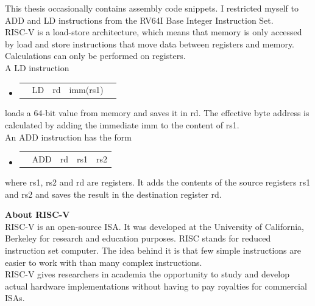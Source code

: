 \documentclass[12pt,a4paper]{article} %
\newenvironment {assembly}{\begingroup \ttfamily \color{Gray} \begin{itemize} \item[]}{\end{itemize}\endgroup}
\begin{document}
This thesis occasionally contains assembly code snippets. I restricted myself to ADD and LD instructions from the RV64I Base Integer Instruction Set.\\
RISC-V is a load-store architecture, which means that memory is only accessed by load and store instructions that move data between registers and memory. Calculations can only be performed on registers. \\ 
A LD instruction  
\begin{assembly}
	\begin{tabularx} {\textwidth} {n o a a X}
		& LD 	& rd & imm(rs1) \\
	\end{tabularx}
\end{assembly}
loads a 64-bit value from memory and saves it in rd. The effective byte address is calculated by adding the immediate imm to the content of rs1.\\
An ADD instruction has the form
\begin{assembly}
	\begin{tabularx} {\textwidth} {n o a a X}
		& ADD 	& rd & rs1		& rs2 \\
	\end{tabularx}
\end{assembly}
where rs1, rs2 and rd are registers. It adds the contents of the source registers rs1 and rs2 and saves the result in the destination register rd.\\

\cite[p.~5, p.~18f, p.~31]{riscv}


\vspace{2cm}


{}
\label{sec-riscv}
\textbf{\Large About RISC-V}\\

RISC-V is an open-source ISA. It was developed at the University of California, Berkeley for research and education purposes. RISC stands for reduced instruction set computer. The idea behind it is that few simple instructions are easier to work with than many complex instructions.\\
RISC-V gives researchers in academia the opportunity to study and develop actual hardware implementations without having to pay royalties for commercial ISAs. \\

\cite{RISCV-webpage} \cite[p.~1-3]{riscv}


\newpage
\end{document}
